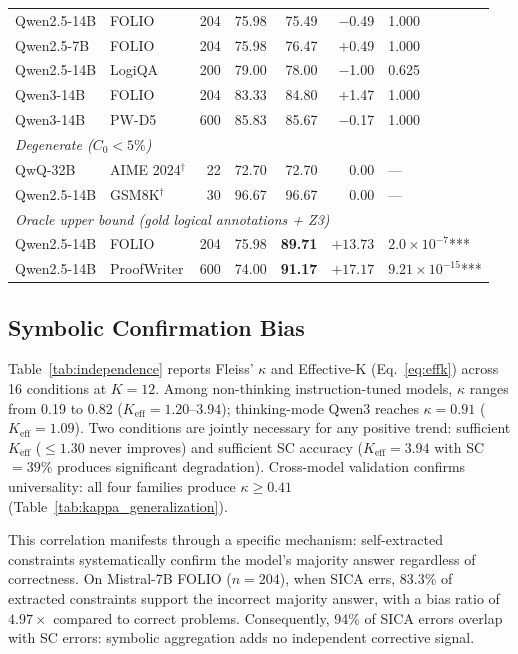 \begin{table}[t]
\begin{tabular}{@{}llrrrrl@{}}
Qwen2.5-14B & FOLIO & 204 & 75.98 & 75.49 & $-$0.49 & 1.000 \\
Qwen2.5-7B & FOLIO & 204 & 75.98 & 76.47 & $+$0.49 & 1.000 \\
Qwen2.5-14B & LogiQA & 200 & 79.00 & 78.00 & $-$1.00 & 0.625 \\
Qwen3-14B & FOLIO & 204 & 83.33 & 84.80 & $+$1.47 & 1.000 \\
Qwen3-14B & PW-D5 & 600 & 85.83 & 85.67 & $-$0.17 & 1.000 \\
\midrule
\multicolumn{7}{l}{\textit{Degenerate ($C_0 < 5\%$)}} \\
QwQ-32B & AIME 2024$^\dagger$ & 22 & 72.70 & 72.70 & 0.00 & \textrm{---} \\
Qwen2.5-14B & GSM8K$^\dagger$ & 30 & 96.67 & 96.67 & 0.00 & \textrm{---} \\
\midrule
\multicolumn{7}{l}{\textit{Oracle upper bound (gold logical annotations + Z3)}} \\
Qwen2.5-14B & FOLIO & 204 & 75.98 & \textbf{89.71} & $\mathbf{+13.73}$ & $2.0{\times}10^{-7}${***} \\
Qwen2.5-14B & ProofWriter & 600 & 74.00 & \textbf{91.17} & $\mathbf{+17.17}$ & $9.21{\times}10^{-15}${***} \\
\bottomrule
\end{tabular}
\end{table}

\subsection{Symbolic Confirmation Bias}
\label{sec:confirmation-bias}
\label{sec:effective-k}

Table~\ref{tab:independence} reports Fleiss' $\kappa$ and Effective-K (Eq.~\ref{eq:effk}) across 16 conditions at $K = 12$. Among non-thinking instruction-tuned models, $\kappa$ ranges from 0.19 to 0.82 ($K_{\text{eff}} = 1.20\text{--}3.94$); thinking-mode Qwen3 reaches $\kappa = 0.91$ ($K_{\text{eff}} = 1.09$). Two conditions are jointly necessary for any positive trend: sufficient $K_{\text{eff}}$ ($\leq 1.30$ never improves) and sufficient SC accuracy ($K_{\text{eff}} = 3.94$ with SC $= 39\%$ produces significant degradation). Cross-model validation confirms universality: all four families produce $\kappa \geq 0.41$ (Table~\ref{tab:kappa_generalization}).

This correlation manifests through a specific mechanism: self-extracted constraints systematically confirm the model's majority answer regardless of correctness. On Mistral-7B FOLIO ($n = 204$), when SICA errs, 83.3\% of extracted constraints support the incorrect majority answer, with a bias ratio of $4.97\times$ compared to correct problems. Consequently, 94\% of SICA errors overlap with SC errors: symbolic aggregation adds no independent corrective signal.

